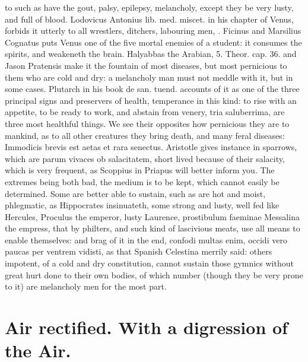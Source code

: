 {to such as have the gout, palsy, epilepsy, melancholy, except they be
very lusty, and full of blood. Lodovicus Antonius lib. med.
miscet. in his chapter of Venus, forbids it utterly to all wrestlers,
ditchers, labouring men, \etc{}. Ficinus and Marsilius Cognatus
puts Venus one of the five mortal enemies of a student: it consumes the
spirits, and weakeneth the brain. Halyabbas the Arabian, 5. Theor. cap.
36. and Jason Pratensis make it the fountain of most diseases,
but most pernicious to them who are cold and dry: a melancholy
man must not meddle with it, but in some cases. Plutarch in his book de
san. tuend. accounts of it as one of the three principal signs and
preservers of health, temperance in this kind: to rise with an
appetite, to be ready to work, and abstain from venery, tria
saluberrima, are three most healthful things. We see their opposites
how pernicious they are to mankind, as to all other creatures they
bring death, and many feral diseases: Immodicis brevis est aetas et
rara senectus. Aristotle gives instance in sparrows, which are parum
vivaces ob salacitatem, short lived because of their salacity,
which is very frequent, as Scoppius in Priapus will better inform you.
The extremes being both bad, the medium is to be kept, which
cannot easily be determined. Some are better able to sustain, such as
are hot and moist, phlegmatic, as Hippocrates insinuateth, some strong
and lusty, well fed like Hercules,  Proculus the emperor,
lusty Laurence, prostibulum faeminae Messalina the empress, that
by philters, and such kind of lascivious meats, use all means to
enable themselves: and brag of it in the end, confodi multas
enim, occidi vero paucas per ventrem vidisti, as that Spanish
Celestina merrily said: others impotent, of a cold and dry
constitution, cannot sustain those gymnics without great hurt done to
their own bodies, of which number (though they be very prone to it) are
melancholy men for the most part.


\section{Air rectified. With a digression of the Air.}

}
